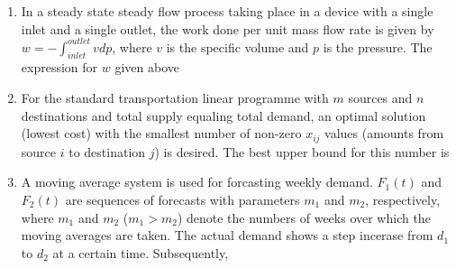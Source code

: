 \documentclass[journal,12pt,onecolumn]{IEEEtran}
\begin{document}
\begin{enumerate}[resume]
    \item In a steady state steady flow process taking place in a device with a single inlet and a single outlet, the work done per unit mass flow rate is given by $w=-\int_{inlet}^{outlet} vdp$, where $v$ is the specific volume and $p$ is the pressure. The expression for $w$ given above\\

          \begin{enumerate}
          \end{enumerate}

    \item For the standard transportation linear programme with $m$ sources and $n$ destinations and total supply equaling total demand, an optimal solution (lowest cost) with the smallest number of non-zero $x_{ij}$ values (amounts from source $i$ to destination $j$) is desired. The best upper bound for this number is\\

          \begin{enumerate}
          \end{enumerate}

    \item A moving average system is used for forcasting weekly demand. $F_1(t)$ and $F_2(t)$ are sequences of forecasts with parameters $m_1$ and $m_2$, respectively, where $m_1$ and $m_2$ ($m_1>m_2$) denote the numbers of weeks over which the moving averages are taken. The actual demand shows a step incerase from $d_1$ to $d_2$ at a certain time. Subsequently,\\


\end{enumerate}
\end{document}
